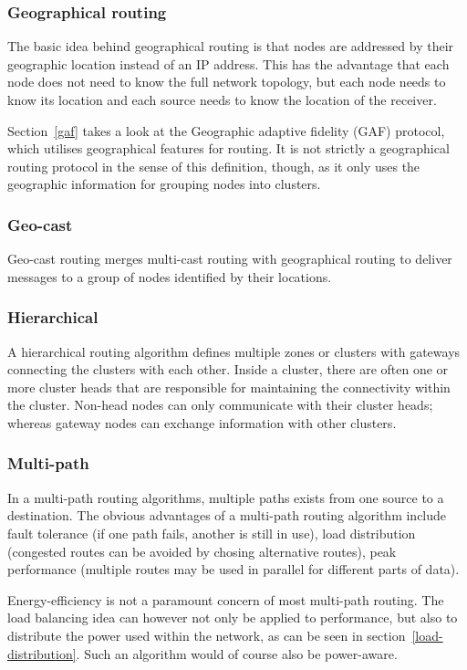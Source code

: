 \subsubsection*{Geographical routing}
The basic idea behind geographical routing is that nodes are addressed by
their geographic location instead of an IP address. This has the advantage
that each node does not need to know the full network topology, but each
node needs to know its location and each source needs to know the location
of the receiver.

Section~\ref{gaf} takes a look at the Geographic adaptive fidelity (GAF)
protocol, which utilises geographical features for routing. It is not strictly
a geographical routing protocol in the sense of this definition, though,
as it only uses the geographic information for grouping nodes into clusters.

\subsubsection*{Geo-cast}
Geo-cast routing merges multi-cast routing with geographical routing to
deliver messages to a group of nodes identified by their locations.

\subsubsection*{Hierarchical}
A hierarchical routing algorithm defines multiple zones or clusters with
gateways connecting the clusters with each other. Inside a cluster, there
are often one or more cluster heads that are responsible for maintaining the
connectivity within the cluster. Non-head nodes can only communicate with
their cluster heads; whereas gateway nodes can exchange information with
other clusters.


\subsubsection*{Multi-path}
In a multi-path routing algorithms, multiple paths exists from one source
to a destination. The obvious advantages of a multi-path routing
algorithm include fault tolerance (if one path fails, another is still in
use), load distribution (congested routes can be avoided by chosing alternative
routes), peak performance (multiple routes may be used in parallel for different
parts of data).

Energy-efficiency is not a paramount concern of most multi-path routing. The
load balancing idea can however not only be applied to performance, but also
to distribute the power used within the network, as can be seen
in section~\ref{load-distribution}. Such an algorithm would of course also be power-aware.

